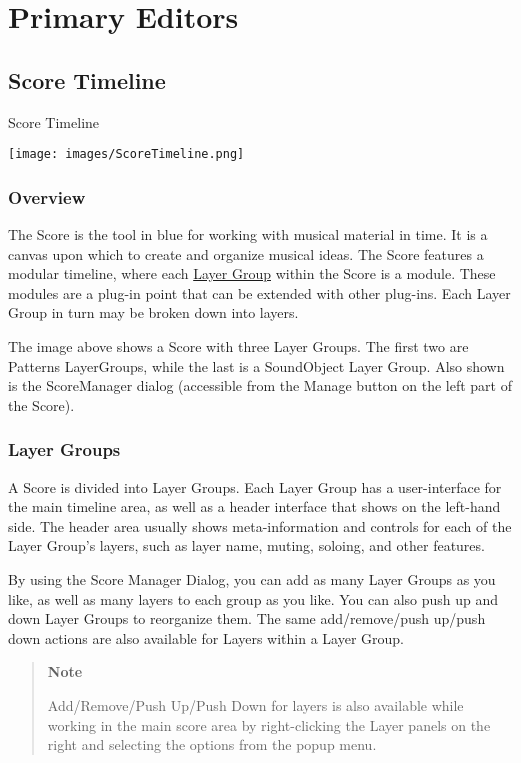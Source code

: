 \section{Primary Editors}\label{primaryEditors}

\subsection{Score Timeline}\label{scoreTimeline}

Score Timeline

\texttt{[image: images/ScoreTimeline.png]}

\subsubsection{Overview}

The Score is the tool in blue for working with musical material in time.
It is a canvas upon which to create and organize musical ideas. The
Score features a modular timeline, where each
\protect\hyperlink{layerGroups}{Layer Group} within the Score is a
module. These modules are a plug-in point that can be extended with
other plug-ins. Each Layer Group in turn may be broken down into layers.

The image above shows a Score with three Layer Groups. The first two are
Patterns LayerGroups, while the last is a SoundObject Layer Group. Also
shown is the ScoreManager dialog (accessible from the Manage button on
the left part of the Score).

\hypertarget{layerGroups}{\subsubsection{Layer Groups}\label{layerGroups}}

A Score is divided into Layer Groups. Each Layer Group has a
user-interface for the main timeline area, as well as a header interface
that shows on the left-hand side. The header area usually shows
meta-information and controls for each of the Layer Group's layers, such
as layer name, muting, soloing, and other features.

By using the Score Manager Dialog, you can add as many Layer Groups as
you like, as well as many layers to each group as you like. You can also
push up and down Layer Groups to reorganize them. The same
add/remove/push up/push down actions are also available for Layers
within a Layer Group.

\begin{quote}
\textbf{Note}

Add/Remove/Push Up/Push Down for layers is also available while working
in the main score area by right-clicking the Layer panels on the right
and selecting the options from the popup menu.
\end{quote}

